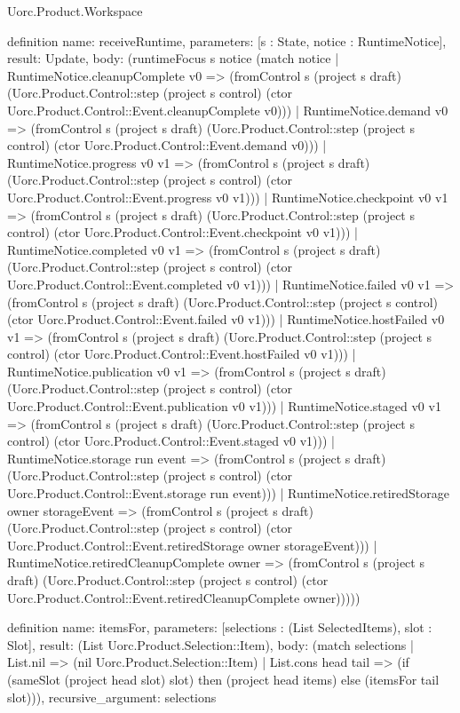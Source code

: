 \begin{lexlean}{Uorc.Product.Workspace}
\begin{semanticmodule}
definition{
  name: receiveRuntime,
  parameters: [s : State, notice : RuntimeNotice],
  result: Update,
  body: (runtimeFocus s notice (match notice
    | RuntimeNotice.cleanupComplete v0 => (fromControl s (project s draft) (Uorc.Product.Control::step (project s control) (ctor Uorc.Product.Control::Event.cleanupComplete v0)))
    | RuntimeNotice.demand v0 => (fromControl s (project s draft) (Uorc.Product.Control::step (project s control) (ctor Uorc.Product.Control::Event.demand v0)))
    | RuntimeNotice.progress v0 v1 => (fromControl s (project s draft) (Uorc.Product.Control::step (project s control) (ctor Uorc.Product.Control::Event.progress v0 v1)))
    | RuntimeNotice.checkpoint v0 v1 => (fromControl s (project s draft) (Uorc.Product.Control::step (project s control) (ctor Uorc.Product.Control::Event.checkpoint v0 v1)))
    | RuntimeNotice.completed v0 v1 => (fromControl s (project s draft) (Uorc.Product.Control::step (project s control) (ctor Uorc.Product.Control::Event.completed v0 v1)))
    | RuntimeNotice.failed v0 v1 => (fromControl s (project s draft) (Uorc.Product.Control::step (project s control) (ctor Uorc.Product.Control::Event.failed v0 v1)))
    | RuntimeNotice.hostFailed v0 v1 => (fromControl s (project s draft) (Uorc.Product.Control::step (project s control) (ctor Uorc.Product.Control::Event.hostFailed v0 v1)))
    | RuntimeNotice.publication v0 v1 => (fromControl s (project s draft) (Uorc.Product.Control::step (project s control) (ctor Uorc.Product.Control::Event.publication v0 v1)))
    | RuntimeNotice.staged v0 v1 => (fromControl s (project s draft) (Uorc.Product.Control::step (project s control) (ctor Uorc.Product.Control::Event.staged v0 v1)))
    | RuntimeNotice.storage run event => (fromControl s (project s draft) (Uorc.Product.Control::step (project s control) (ctor Uorc.Product.Control::Event.storage run event)))
    | RuntimeNotice.retiredStorage owner storageEvent => (fromControl s (project s draft) (Uorc.Product.Control::step (project s control) (ctor Uorc.Product.Control::Event.retiredStorage owner storageEvent)))
    | RuntimeNotice.retiredCleanupComplete owner => (fromControl s (project s draft) (Uorc.Product.Control::step (project s control) (ctor Uorc.Product.Control::Event.retiredCleanupComplete owner)))))
}

definition{
  name: itemsFor,
  parameters: [selections : (List SelectedItems), slot : Slot],
  result: (List Uorc.Product.Selection::Item),
  body: (match selections
    | List.nil => (nil Uorc.Product.Selection::Item)
    | List.cons head tail => (if (sameSlot (project head slot) slot) then (project head items) else (itemsFor tail slot))),
  recursive_argument: selections
}


\end{semanticmodule}
\end{lexlean}

